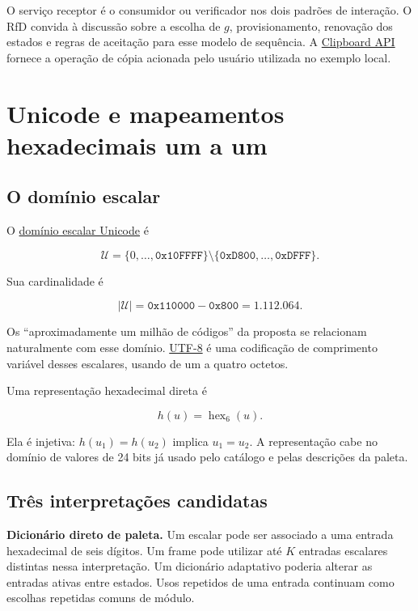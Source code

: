 \documentclass[
  11pt,
  a4paper,
]{article}
\begin{document}
O serviço receptor é o consumidor ou verificador nos dois padrões de
interação. O RfD convida à discussão sobre a escolha de \(g\),
provisionamento, renovação dos estados e regras de aceitação para esse
modelo de sequência. A
\href{https://www.w3.org/TR/clipboard-apis/}{Clipboard API} fornece a
operação de cópia acionada pelo usuário utilizada no exemplo local.

\hypertarget{unicode-e-mapeamentos-hexadecimais-um-a-um}{%
\section{Unicode e mapeamentos hexadecimais um a
um}\label{unicode-e-mapeamentos-hexadecimais-um-a-um}}

\hypertarget{o-domuxednio-escalar}{%
\subsection{O domínio escalar}\label{o-domuxednio-escalar}}

O
\href{https://www.unicode.org/versions/Unicode18.0.0/core-spec/chapter-3/}{domínio
escalar Unicode} é

\[
\mathcal U=
\{0,\ldots,\mathtt{0x10FFFF}\}
\setminus
\{\mathtt{0xD800},\ldots,\mathtt{0xDFFF}\}.
\]

Sua cardinalidade é

\[
|\mathcal U|=
\mathtt{0x110000}-\mathtt{0x800}
=1.112.064.
\]

Os ``aproximadamente um milhão de códigos'' da proposta se relacionam
naturalmente com esse domínio.
\href{https://www.rfc-editor.org/rfc/rfc3629.html}{UTF-8} é uma
codificação de comprimento variável desses escalares, usando de um a
quatro octetos.

Uma representação hexadecimal direta é

\[
h(u)=\operatorname{hex}_6(u).
\]

Ela é injetiva: \(h(u_1)=h(u_2)\) implica \(u_1=u_2\). A representação
cabe no domínio de valores de 24 bits já usado pelo catálogo e pelas
descrições da paleta.

\hypertarget{truxeas-interpretauxe7uxf5es-candidatas}{%
\subsection{Três interpretações
candidatas}\label{truxeas-interpretauxe7uxf5es-candidatas}}

\textbf{Dicionário direto de paleta.} Um escalar pode ser associado a
uma entrada hexadecimal de seis dígitos. Um frame pode utilizar até
\(K\) entradas escalares distintas nessa interpretação. Um dicionário
adaptativo poderia alterar as entradas ativas entre estados. Usos
repetidos de uma entrada continuam como escolhas repetidas comuns de
módulo.
\end{document}

